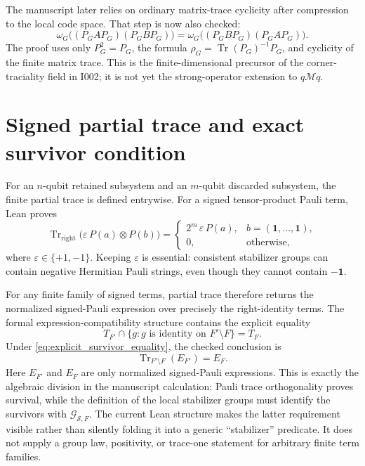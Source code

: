 \documentclass[11pt,reqno]{amsart}
\numberwithin{equation}{section}
\theoremstyle{definition}
\theoremstyle{remark}
\newcommand{\cM}{\mathcal M}
\newcommand{\cG}{\mathcal G}
\newcommand{\cS}{\mathcal S}
\newcommand{\id}{\mathbf 1}
\newcommand{\Tr}{\operatorname{Tr}}
\begin{document}
The manuscript later relies on ordinary matrix-trace cyclicity after
compression to the local code space.  That step is now also checked:
\begin{equation}
  \omega_G\bigl((P_GAP_G)(P_GBP_G)\bigr)
  =
  \omega_G\bigl((P_GBP_G)(P_GAP_G)\bigr).
  \label{eq:finite_corner_traciality}
\end{equation}
The proof uses only $P_G^2=P_G$, the formula
$\rho_G=\Tr(P_G)^{-1}P_G$, and cyclicity of the finite matrix trace.  This is
the finite-dimensional precursor of the corner-traciality field in I002; it
is not yet the strong-operator extension to $q\cM q$.

\section{Signed partial trace and exact survivor condition}
\label{sec:partial_trace}

For an $n$-qubit retained subsystem and an $m$-qubit discarded subsystem, the
finite partial trace is defined entrywise.  For a signed tensor-product Pauli
term, Lean proves
\begin{equation}
  \Tr_{\mathrm{right}}\bigl(\varepsilon\,P(a)\otimes P(b)\bigr)
  =
  \begin{cases}
    2^m\,\varepsilon\,P(a),& b=(\id,\ldots,\id),\\
    0,&\text{otherwise},
  \end{cases}
  \label{eq:signed_pauli_partial_trace}
\end{equation}
where $\varepsilon\in\{+1,-1\}$.  Keeping $\varepsilon$ is essential:
consistent stabilizer groups can contain negative Hermitian Pauli strings,
even though they cannot contain $-\id$.

For any finite family of signed terms, partial trace therefore returns the
normalized signed-Pauli expression over precisely the right-identity terms.
The formal expression-compatibility structure contains the explicit equality
\begin{equation}
  T_{F'}\cap\{g:\text{$g$ is identity on }F'\setminus F\}=T_F.
  \label{eq:explicit_survivor_equality}
\end{equation}
Under \eqref{eq:explicit_survivor_equality}, the checked conclusion is
\begin{equation}
  \Tr_{F'\setminus F}(E_{F'})=E_F.
  \label{eq:checked_expression_compatibility}
\end{equation}
Here $E_{F'}$ and $E_F$ are only normalized signed-Pauli expressions.  This
is exactly the algebraic division in the manuscript calculation: Pauli trace
orthogonality proves survival, while the definition of the local stabilizer
groups must identify the survivors with $\cG_{\cS,F}$.  The current Lean
structure makes the latter requirement visible rather than silently folding it
into a generic ``stabilizer'' predicate.  It does not supply a group law,
positivity, or trace-one statement for arbitrary finite term families.
\end{document}
